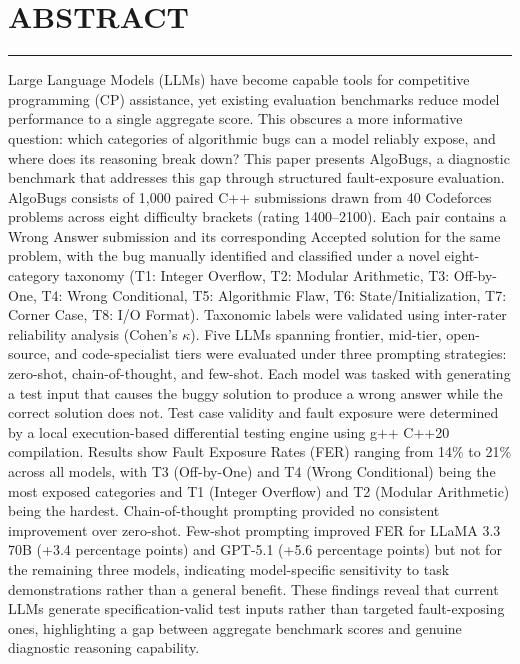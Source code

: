 \chapter*{ABSTRACT}
\thispagestyle{plain}
\noindent\rule{\linewidth}{0.5pt}

Large Language Models (LLMs) have become capable tools for competitive programming (CP) assistance, yet existing evaluation benchmarks reduce model performance to a single aggregate score. This obscures a more informative question: which categories of algorithmic bugs can a model reliably expose, and where does its reasoning break down? This paper presents AlgoBugs, a diagnostic benchmark that addresses this gap through structured fault-exposure evaluation. AlgoBugs consists of 1,000 paired C++ submissions drawn from 40 Codeforces problems across eight difficulty brackets (rating 1400--2100). Each pair contains a Wrong Answer submission and its corresponding Accepted solution for the same problem, with the bug manually identified and classified under a novel eight-category taxonomy (T1: Integer Overflow, T2: Modular Arithmetic, T3: Off-by-One, T4: Wrong Conditional, T5: Algorithmic Flaw, T6: State/Initialization, T7: Corner Case, T8: I/O Format). Taxonomic labels were validated using inter-rater reliability analysis (Cohen's $\kappa$). Five LLMs spanning frontier, mid-tier, open-source, and code-specialist tiers were evaluated under three prompting strategies: zero-shot, chain-of-thought, and few-shot. Each model was tasked with generating a test input that causes the buggy solution to produce a wrong answer while the correct solution does not. Test case validity and fault exposure were determined by a local execution-based differential testing engine using g++ C++20 compilation. Results show Fault Exposure Rates (FER) ranging from 14\% to 21\% across all models, with T3 (Off-by-One) and T4 (Wrong Conditional) being the most exposed categories and T1 (Integer Overflow) and T2 (Modular Arithmetic) being the hardest. Chain-of-thought prompting provided no consistent improvement over zero-shot. Few-shot prompting improved FER for LLaMA 3.3 70B (+3.4 percentage points) and GPT-5.1 (+5.6 percentage points) but not for the remaining three models, indicating model-specific sensitivity to task demonstrations rather than a general benefit. These findings reveal that current LLMs generate specification-valid test inputs rather than targeted fault-exposing ones, highlighting a gap between aggregate benchmark scores and genuine diagnostic reasoning capability.

